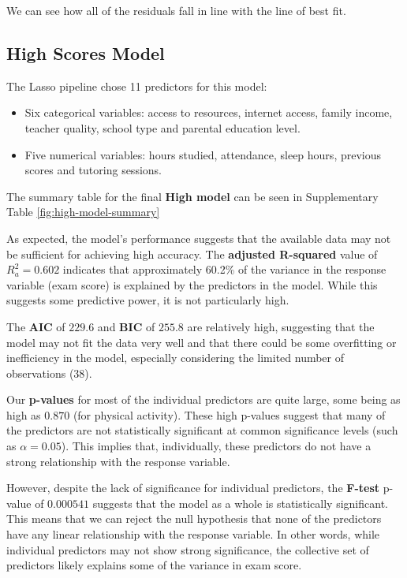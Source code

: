 \documentclass[twocolumn]{article} %
\begin{document}
We can see how all of the residuals fall in line with the line of best fit.

\subsection*{High Scores Model}

The Lasso pipeline chose 11 predictors for this model:

\begin{itemize}
  \item Six categorical variables: access to resources, internet access, family income, teacher quality, school type and parental education level.
  \item Five numerical variables: hours studied, attendance, sleep hours, previous scores and tutoring sessions.
\end{itemize}

The summary table for the final \textbf{High model} can be seen in Supplementary Table \ref{fig:high-model-summary}

As expected, the model's performance suggests that the available data may not be sufficient for achieving high accuracy. The \textbf{adjusted R-squared} value of $R^2_a = 0.602$ indicates that approximately 60.2\% of the variance in the response variable (exam score) is explained by the predictors in the model. While this suggests some predictive power, it is not particularly high.

The \textbf{AIC} of $229.6$ and \textbf{BIC} of $255.8$ are relatively high, suggesting that the model may not fit the data very well and that there could be some overfitting or inefficiency in the model, especially considering the limited number of observations (38).

Our \textbf{p-values} for most of the individual predictors are quite large, some being as high as $0.870$ (for physical activity). These high p-values suggest that many of the predictors are not statistically significant at common significance levels (such as $\alpha=0.05$). This implies that, individually, these predictors do not have a strong relationship with the response variable.

However, despite the lack of significance for individual predictors, the \textbf{F-test} p-value of $0.000541$ suggests that the model as a whole is statistically significant. This means that we can reject the null hypothesis that none of the predictors have any linear relationship with the response variable. In other words, while individual predictors may not show strong significance, the collective set of predictors likely explains some of the variance in exam score.
\end{document}
